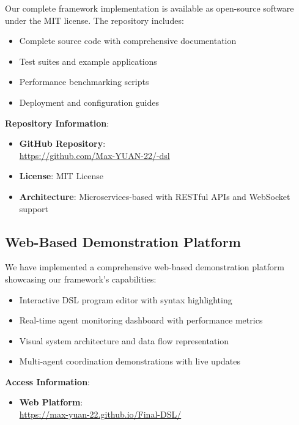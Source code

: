 \documentclass[conference]{IEEEtran}
\begin{document}
Our complete framework implementation is available as open-source software under the MIT license. The repository includes:

\begin{itemize}
\item Complete source code with comprehensive documentation
\item Test suites and example applications
\item Performance benchmarking scripts
\item Deployment and configuration guides
\end{itemize}

\textbf{Repository Information}:
\begin{itemize}
\item \textbf{GitHub Repository}: \\
\href{https://github.com/Max-YUAN-22/-dsl}{https://github.com/Max-YUAN-22/-dsl}
\item \textbf{License}: MIT License
\item \textbf{Architecture}: Microservices-based with RESTful APIs and WebSocket support
\end{itemize}

\subsection{Web-Based Demonstration Platform}

We have implemented a comprehensive web-based demonstration platform showcasing our framework's capabilities:

\begin{itemize}
\item Interactive DSL program editor with syntax highlighting
\item Real-time agent monitoring dashboard with performance metrics~\cite{zhang2025}
\item Visual system architecture and data flow representation
\item Multi-agent coordination demonstrations with live updates
\end{itemize}

\textbf{Access Information}:
\begin{itemize}
\item \textbf{Web Platform}: \\
\href{https://max-yuan-22.github.io/Final-DSL/}{https://max-yuan-22.github.io/Final-DSL/}
\end{itemize}
\end{document}
